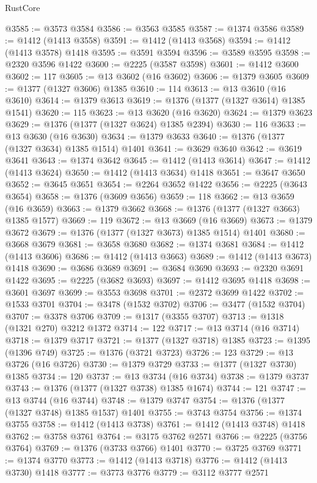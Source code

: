 \begin{lexlean}{RustCore}
\begin{coremodule}
@3585 := @3573 @3584
@3586 := @3563 @3585
@3587 := @1374 @3586
@3589 := @1412 (@1413 @3558)
@3591 := @1412 (@1413 @3568)
@3594 := @1412 (@1413 @3578) @1418
@3595 := @3591 @3594
@3596 := @3589 @3595
@3598 := @2320 @3596 @1422
@3600 := @2225 (@3587 @3598)
@3601 := @1412 @3600
@3602 := 117
@3605 := @13 @3602 (@16 @3602)
@3606 := @1379 @3605
@3609 := @1377 (@1327 @3606) @1385
@3610 := 114
@3613 := @13 @3610 (@16 @3610)
@3614 := @1379 @3613
@3619 := @1376 (@1377 (@1327 @3614) @1385 @1541)
@3620 := 115
@3623 := @13 @3620 (@16 @3620)
@3624 := @1379 @3623
@3629 := @1376 (@1377 (@1327 @3624) @1385 @2394)
@3630 := 116
@3633 := @13 @3630 (@16 @3630)
@3634 := @1379 @3633
@3640 := @1376 (@1377 (@1327 @3634) @1385 @1514) @1401
@3641 := @3629 @3640
@3642 := @3619 @3641
@3643 := @1374 @3642
@3645 := @1412 (@1413 @3614)
@3647 := @1412 (@1413 @3624)
@3650 := @1412 (@1413 @3634) @1418
@3651 := @3647 @3650
@3652 := @3645 @3651
@3654 := @2264 @3652 @1422
@3656 := @2225 (@3643 @3654)
@3658 := @1376 (@3609 @3656)
@3659 := 118
@3662 := @13 @3659 (@16 @3659)
@3663 := @1379 @3662
@3668 := @1376 (@1377 (@1327 @3663) @1385 @1577)
@3669 := 119
@3672 := @13 @3669 (@16 @3669)
@3673 := @1379 @3672
@3679 := @1376 (@1377 (@1327 @3673) @1385 @1514) @1401
@3680 := @3668 @3679
@3681 := @3658 @3680
@3682 := @1374 @3681
@3684 := @1412 (@1413 @3606)
@3686 := @1412 (@1413 @3663)
@3689 := @1412 (@1413 @3673) @1418
@3690 := @3686 @3689
@3691 := @3684 @3690
@3693 := @2320 @3691 @1422
@3695 := @2225 (@3682 @3693)
@3697 := @1412 @3695 @1418
@3698 := @3601 @3697
@3699 := @3553 @3698
@3701 := @2372 @3699 @1422
@3702 := @1533 @3701
@3704 := @3478 (@1532 @3702)
@3706 := @3477 (@1532 @3704)
@3707 := @3378 @3706
@3709 := @1317 (@3355 @3707)
@3713 := @1318 (@1321 @270) @3212 @1372
@3714 := 122
@3717 := @13 @3714 (@16 @3714)
@3718 := @1379 @3717
@3721 := @1377 (@1327 @3718) @1385
@3723 := @1395 (@1396 @749)
@3725 := @1376 (@3721 @3723)
@3726 := 123
@3729 := @13 @3726 (@16 @3726)
@3730 := @1379 @3729
@3733 := @1377 (@1327 @3730) @1385
@3734 := 120
@3737 := @13 @3734 (@16 @3734)
@3738 := @1379 @3737
@3743 := @1376 (@1377 (@1327 @3738) @1385 @1674)
@3744 := 121
@3747 := @13 @3744 (@16 @3744)
@3748 := @1379 @3747
@3754 := @1376 (@1377 (@1327 @3748) @1385 @1537) @1401
@3755 := @3743 @3754
@3756 := @1374 @3755
@3758 := @1412 (@1413 @3738)
@3761 := @1412 (@1413 @3748) @1418
@3762 := @3758 @3761
@3764 := @3175 @3762 @2571
@3766 := @2225 (@3756 @3764)
@3769 := @1376 (@3733 @3766) @1401
@3770 := @3725 @3769
@3771 := @1374 @3770
@3773 := @1412 (@1413 @3718)
@3776 := @1412 (@1413 @3730) @1418
@3777 := @3773 @3776
@3779 := @3112 @3777 @2571

\end{coremodule}
\end{lexlean}
